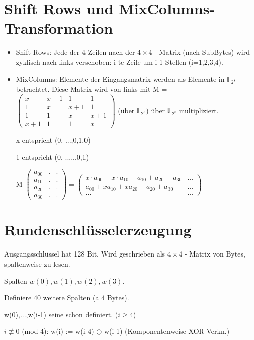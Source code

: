 \section{Shift Rows und MixColumns-Transformation}
\begin{itemize}
  \item Shift Rows: Jede der 4 Zeilen nach der $4 \times 4$ - Matrix (nach SubBytes) wird zyklisch nach links verschoben: i-te Zeile um i-1 Stellen (i=1,2,3,4).
  \item MixColumns: Elemente der Eingangsmatrix werden als Elemente in $\mathbb{F}_{2^8}$ betrachtet. Diese Matrix wird von links mit M = $\begin{pmatrix}x & x+1 & 1  & 1\\ 1 & x & x+1 & 1 \\ 1 & 1 & x & x+1 \\ x+1 & 1 & 1 & x \end{pmatrix}$ (über $\mathbb{F}_{2^8}$) über $\mathbb{F}_{2^8}$ multipliziert.

  x entspricht (0, ...,0,1,0)

  1 entspricht (0, .....,0,1)

  M $\begin{pmatrix}a_{00} & . & . \\ a_{10} & . & . \\ a_{20} &. &.  \\ a_{30} &. &. \end{pmatrix} =  \begin{pmatrix} x \cdot a_{00} + x \cdot a_{10} + a_{10} + a_{20} + a_{30} & ... \\  a_{00} + x a_{10} + x a_{20} + a_{20} + a_{30} & ... \\ ... & ... \end{pmatrix}$
\end{itemize}

\section{Rundenschlüsselerzeugung}

Ausgangsschlüssel hat 128 Bit. Wird geschrieben als $4 \times 4$ - Matrix von Bytes, spaltenweise zu lesen.

Spalten $w(0), w(1), w(2), w(3)$.

Definiere 40 weitere Spalten (a 4 Bytes).

w(0),...,w(i-1) seine schon definiert. ($i \ge 4$)

$i \not \equiv 0$ (mod 4): w(i) := w(i-4) $\oplus$ w(i-1) (Komponentenweise XOR-Verkn.)


